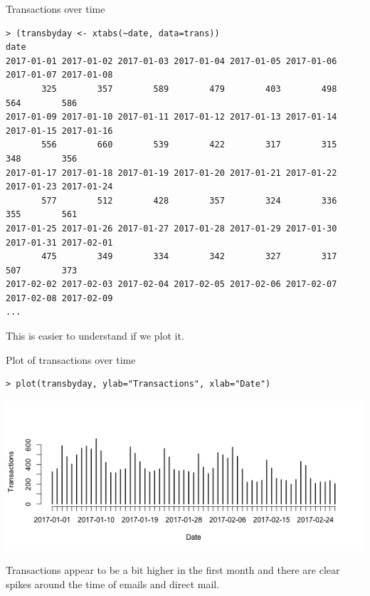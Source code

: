 \documentclass[10pt, aspectratio=169]{beamer}
\begin{document}
\begin{frame}[fragile]{Transactions over time}
\begin{lstlisting}[basicstyle=\tiny\ttfamily]
> (transbyday <- xtabs(~date, data=trans))
date
2017-01-01 2017-01-02 2017-01-03 2017-01-04 2017-01-05 2017-01-06 2017-01-07 2017-01-08 
       325        357        589        479        403        498        564        586 
2017-01-09 2017-01-10 2017-01-11 2017-01-12 2017-01-13 2017-01-14 2017-01-15 2017-01-16 
       556        660        539        422        317        315        348        356 
2017-01-17 2017-01-18 2017-01-19 2017-01-20 2017-01-21 2017-01-22 2017-01-23 2017-01-24 
       577        512        428        357        324        336        355        561 
2017-01-25 2017-01-26 2017-01-27 2017-01-28 2017-01-29 2017-01-30 2017-01-31 2017-02-01 
       475        349        334        342        327        317        507        373 
2017-02-02 2017-02-03 2017-02-04 2017-02-05 2017-02-06 2017-02-07 2017-02-08 2017-02-09 
...
\end{lstlisting}
\alert{This is easier to understand if we plot it.} 
\end{frame}

\begin{frame}[fragile]{Plot of transactions over time}
\begin{lstlisting}
> plot(transbyday, ylab="Transactions", xlab="Date")
\end{lstlisting}
\begin{center}
\includegraphics[height=0.6\textheight]{images/transbyday.png}\\
\end{center}
\alert{Transactions appear to be a bit higher in the first month and there are clear spikes around the time of emails and direct mail.}
\end{frame}
\end{document}
